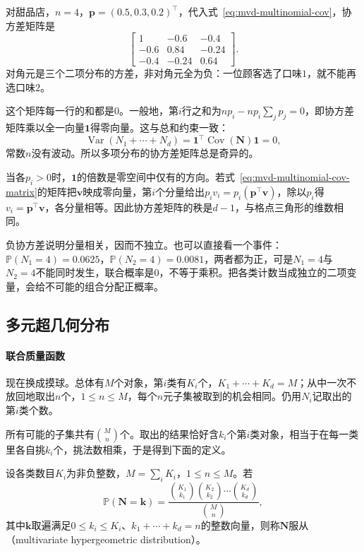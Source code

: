 对甜品店，$n=4$，$\bm{p}=(0.5,0.3,0.2)^{\top}$，代入式~\eqref{eq:mvd-multinomial-cov}，协方差矩阵是
\[
 \begin{bmatrix}
  1 & -0.6 & -0.4\\
  -0.6 & 0.84 & -0.24\\
  -0.4 & -0.24 & 0.64
 \end{bmatrix} .
\]
对角元是三个二项分布的方差，非对角元全为负：一位顾客选了口味$1$，就不能再选口味$2$。

这个矩阵每一行的和都是$0$。一般地，第$i$行之和为$np_i-np_i\sum_jp_j=0$，即协方差矩阵乘以全一向量$\bm{1}$得零向量。这与总和约束一致：
\[
 \operatorname{Var}(N_1+\cdots+N_d)=\bm{1}^{\top}\operatorname{Cov}(\bm{N})\bm{1}=0 ,
\]
常数$n$没有波动。所以多项分布的协方差矩阵总是奇异的。

当各$p_i>0$时，$\bm{1}$的倍数是零空间中仅有的方向。若式~\eqref{eq:mvd-multinomial-cov-matrix}的矩阵把$\bm{v}$映成零向量，第$i$个分量给出$p_iv_i=p_i(\bm{p}^{\top}\bm{v})$，除以$p_i$得$v_i=\bm{p}^{\top}\bm{v}$，各分量相等。因此协方差矩阵的秩是$d-1$，与格点三角形的维数相同。

负协方差说明分量相关，因而不独立。也可以直接看一个事件：$\mathbb{P}(N_1=4)=0.0625$，$\mathbb{P}(N_2=4)=0.0081$，两者都为正，可是$N_1=4$与$N_2=4$不能同时发生，联合概率是$0$，不等于乘积。把各类计数当成独立的二项变量，会给不可能的组合分配正概率。

\subsection{多元超几何分布}
\label{sec:mvd-multivariate-hypergeometric}

\paragraph{联合质量函数}
现在换成摸球。总体有$M$个对象，第$i$类有$K_i$个，$K_1+\cdots+K_d=M$；从中一次不放回地取出$n$个，$1\leq n\leq M$，每个$n$元子集被取到的机会相同。仍用$N_i$记取出的第$i$类个数。

所有可能的子集共有$\binom{M}{n}$个。取出的结果恰好含$k_i$个第$i$类对象，相当于在每一类里各自挑$k_i$个，挑法数相乘，于是得到下面的定义。

\begin{definition}[多元超几何分布]
\label{def:mvd-multivariate-hypergeometric}
设各类数目$K_i$为非负整数，$M=\sum_iK_i$，$1\leq n\leq M$。若
\begin{equation}
 \mathbb{P}(\bm{N}=\bm{k})=\frac{\binom{K_1}{k_1}\binom{K_2}{k_2}\cdots\binom{K_d}{k_d}}{\binom{M}{n}},
 \label{eq:mvd-mhyper-pmf}
\end{equation}
其中$\bm{k}$取遍满足$0\leq k_i\leq K_i$、$k_1+\cdots+k_d=n$的整数向量，则称$\bm{N}$服从（multivariate hypergeometric distribution）。
\end{definition}

